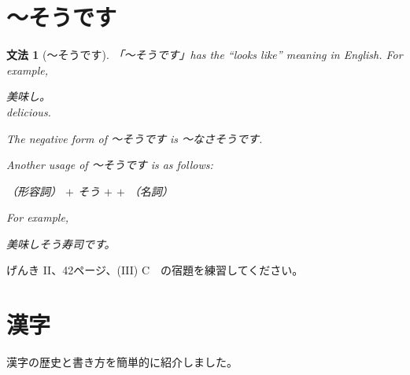 \documentclass[notoc,notitlepage]{tufte-book}
\newtheorem{grammar}{\faBook \enspace 文法}[section]
\begin{document}
\section{〜そうです}%
\label{sec:_soudesu}

\begin{grammar}[〜そうです]
\label{grammar:_soudesu}
  「〜そうです」has the ``looks like'' meaning in English. For example,
  \begin{center}
    美味し。 \\
     delicious.
  \end{center}
  The negative form of 〜そうです is 〜なさそうです.

  Another usage of 〜そうです is as follows:
  \begin{center}
    （形容詞） $+$ そう $+$  $+$ （名詞）
  \end{center}
  For example,
  \begin{center}
    美味しそう寿司です。
  \end{center}
\end{grammar}

\begin{ex}
  げんき II、42ページ、(III) C　の宿題を練習してください。
\end{ex}


\section{漢字}%
\label{sec:kanji}

漢字の歴史と書き方を簡単的に紹介しました。
\end{document}
